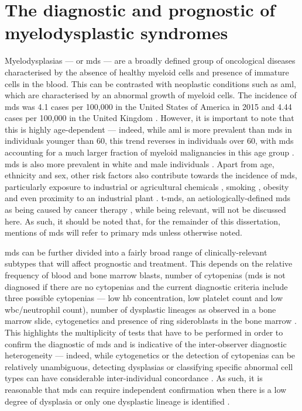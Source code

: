 \section{The diagnostic and prognostic of myelodysplastic syndromes}

Myelodysplasias --- or \ac{mds} --- are a broadly defined group of oncological diseases characterised by the absence of healthy myeloid cells and presence of immature cells in the blood. This can be contrasted with neoplastic conditions such as \ac{aml}, which are characterised by an abnormal growth of myeloid cells. The incidence of \ac{mds} was 4.1 cases per 100,000 in the United States of America in 2015 \cite{Zeidan2019-jj} and 4.44 cases per 100,000 in the United Kingdom \cite{Roman2016-ad}. However, it is important to note that this is highly age-dependent --- indeed, while \ac{aml} is more prevalent than \ac{mds} in individuals younger than 60, this trend reverses in individuals over 60, with \ac{mds} accounting for a much larger fraction of myeloid malignancies in this age group \cite{Zeidan2019-jj}. \ac{mds} is also more prevalent in white and male individuals \cite{Zeidan2019-jj}. Apart from age, ethnicity and sex, other risk factors also contribute towards the incidence of \ac{mds}, particularly exposure to industrial or agricultural chemicals \cite{Nisse2001-qf,Lv2011-iv,Strom2005-pq}, smoking \cite{Lv2011-iv,Strom2005-pq}, obesity \cite{Ma2009-ws} and even proximity to an industrial plant \cite{Nisse2001-qf}. \Ac{t-mds}, an aetiologically-defined \ac{mds} as being caused by cancer therapy \cite{Kuendgen2021-in}, while being relevant, will not be discussed here. As such, it should be noted that, for the remainder of this dissertation, mentions of \ac{mds} will refer to primary \ac{mds} unless otherwise noted.

\ac{mds} can be further divided into a fairly broad range of clinically-relevant subtypes that will affect prognostic and treatment. This depends on the relative frequency of blood and bone marrow blasts, number of cytopenias (\ac{mds} is not diagnosed if there are no cytopenias and the current diagnostic criteria include three possible cytopenias --- low \ac{hb} concentration, low platelet count and low \ac{wbc}/neutrophil count), number of dysplastic lineages as observed in a bone marrow slide, cytogenetics and presence of ring sideroblasts in the bone marrow \cite{Arber2016-os}. This highlights the multiplicity of tests that have to be performed in order to confirm the diagnostic of \ac{mds} and is indicative of the inter-observer diagnostic heterogeneity --- indeed, while cytogenetics or the detection of cytopenias can be relatively unambiguous, detecting dysplasias or classifying specific abnormal cell types can have considerable inter-individual concordance \cite{Font2013-lx, Parmentier2012-wm, Della_Porta2015-hw}. As such, it is reasonable that \ac{mds} can require independent confirmation when there is a low degree of dysplasia or only one dysplastic lineage is identified \cite{Arber2016-os}.

